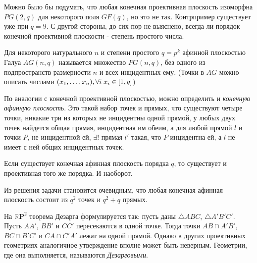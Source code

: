\documentclass{article}
\newenvironment{theorem}[2][Теорема]{\begin{trivlist}
\item[\hskip \labelsep {\bfseries #1}\hskip \labelsep {\bfseries #2.}]}{\end{trivlist}}
\newenvironment{definition}[2][Определение]{\begin{trivlist}
\item[\hskip \labelsep {\bfseries #1}\hskip \labelsep {\bfseries #2.}]}{\end{trivlist}}
\newenvironment{exercise}[2][Упражнение]{\begin{trivlist}
\item[\hskip \labelsep {\bfseries #1}\hskip \labelsep {\bfseries #2.}]}{\end{trivlist}}
\newenvironment{hence}[2][Следствие]{\begin{trivlist}
\item[\hskip \labelsep {\bfseries #1}\hskip \labelsep {\bfseries #2}]}{\end{trivlist}}
\begin{document}
Можно было бы подумать, что любая конечная проективная плоскость изоморфна $PG(2,q)$ для некоторого поля $GF(q)$, но это не так. Контрпример существует уже при $q=9$. С другой стороны, до сих пор не выяснено, всегда ли порядок конечной проективной плоскости - степень простого числа.

\begin{definition}{(Афинная геометрия Галуа)}
Для некоторого натурального $n$ и степени простого $q=p^k$ афинной плоскостью Галуа $AG(n,q)$ называется множество $PG(n,q)$, без одного из подпространств размерности $n$ и всех инцидентных ему. (Точки в $AG$ можно описать числами $(x_1,\dots, x_n), \\{\forall{i}\; x_i\in[1,q]}$)
\end{definition}

По аналогии с конечной проективной плоскостью, можно определить и \emph{конечную афинную плоскость}. Это такой набор точек и прямых, что существуют четыре точки, никакие три из которых не инцидентны одной прямой, у любых двух точек найдется общая прямая, инцидентная им обеим, а для любой прямой $l$ и точки $P$, не инцидентной ей, $\exists!$ прямая $l'$ такая, что $P$ инцидентна ей, а $l$ не имеет с ней общих инцидентных точек.

\begin{exercise}{(Двойственность афинной и проективной плоскостей)}
Если существует конечная афинная плоскость порядка $q$, то существует и проективная того же порядка. И наоборот.
\end{exercise}

\begin{hence}{}
Из решения задачи становится очевидным, что любая конечная афинная плоскость состоит из $q^2$ точек и $q^2+q$ прямых.
\end{hence}

\begin{theorem}{Дезарга}
На $\mathbb{R}\mathbf{P}^2$ теорема Дезарга формулируется так: пусть даны $\triangle ABC$, $\triangle A'B'C'$. Пусть $AA'$, $BB'$ и $CC'$ пересекаются в одной точке. Тогда точки $AB\cap A'B'$, $BC\cap B'C'$ и $CA\cap C'A'$ лежат на одной прямой. Однако в других проективных геометриях аналогичное утверждение вполне может быть неверным. Геометрии, где она выполняется, называются \emph{Дезарговыми}.
\end{theorem}

\end{document}
